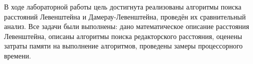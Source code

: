 \Conclusion
В ходе лабораторной работы цель достигнута реализованы алгоритмы поиска расстояний Левенштейна и Дамерау-Левенштейна, проведён их сравнительный анализ. Все задачи были выполнены: дано математическое описание расстояния Левенштейна, описаны алгоритмы поиска редакторского расстояния, оценены затраты памяти на выполнение алгоритмов, проведены замеры процессорного времени.

